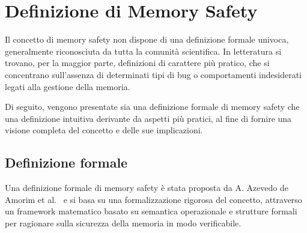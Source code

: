 \section{Definizione di Memory Safety}
\label{sec:memory_safety}

Il concetto di memory safety non dispone di una definizione formale univoca,
generalmente riconosciuta da tutta la comunità scientifica. In letteratura si trovano,
per la maggior parte, definizioni di carattere più pratico, che si concentrano
sull'assenza di determinati tipi di bug o comportamenti indesiderati legati alla
gestione della memoria.

Di seguito, vengono presentate sia una definizione formale di memory safety che una
definizione intuitiva derivante da aspetti più pratici, al fine di fornire una
visione completa del concetto e delle sue implicazioni.

\subsection{Definizione formale}
\label{sec:formal_definition}

Una definizione formale di memory safety è stata proposta da A. Azevedo de
Amorim et al.~\cite{meaning_memory_safety} e si basa su una formalizzazione rigorosa
del concetto, attraverso un framework matematico basato su semantica
operazionale e strutture formali per ragionare sulla sicurezza della memoria in
modo verificabile.

